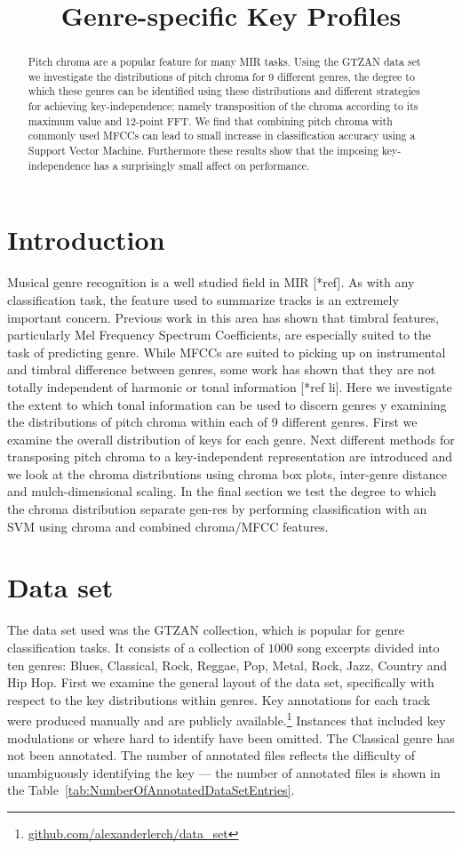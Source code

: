 \documentclass{article}
\title{Genre-specific Key Profiles}
\begin{document}
%
\maketitle
%
\begin{abstract}
Pitch chroma are a popular feature for many MIR tasks. Using the GTZAN data set we investigate the distributions of pitch chroma for 9 different genres, the degree to
which these genres can be identified using these distributions and different strategies for achieving key-independence; namely transposition of the chroma according to its maximum value and 12-point FFT. We find that combining pitch chroma with commonly used MFCCs can lead to small increase in classification accuracy using a Support Vector Machine. Furthermore these results show that the imposing key-independence has a surprisingly small affect on performance.
\end{abstract}
%
\section{Introduction}\label{sec:introduction}
Musical genre recognition is a well studied field in MIR [*ref]. As with any classification task, the feature used to summarize tracks is an extremely important concern. Previous work in this area has shown that timbral features, particularly Mel Frequency Spectrum Coefficients, are especially suited to the task of predicting genre. While MFCCs are suited to picking up on instrumental and timbral difference between genres, some work has shown that they are not totally independent of harmonic or tonal information [*ref li]. Here we investigate the extent to which tonal information can be used to discern genres y examining the distributions of pitch chroma within each of 9 different genres. First we examine the overall distribution of keys for each genre. Next different methods for transposing pitch chroma to a key-independent representation are introduced and we look at the chroma distributions using chroma box plots, inter-genre distance and mulch-dimensional scaling. In the final section we test the degree to which the chroma distribution separate gen-res by performing classification with an SVM using chroma and combined chroma/MFCC features.

\section{Data set}\label{sec:dataset}
The data set used was the GTZAN collection, which is popular for genre classification tasks. It consists of a collection of $1000$ song excerpts divided into ten genres: Blues, Classical, Rock, Reggae, Pop, Metal, Rock, Jazz, Country and Hip Hop. First we examine the general layout of the data set, specifically with respect to the key distributions within genres. Key annotations for each track were produced manually and are publicly available.\footnote{\url{github.com/alexanderlerch/data_set}} Instances that included key modulations or where hard to identify have been omitted. The Classical genre has not been annotated. The number of annotated files reflects the difficulty of unambiguously identifying the key --- the number of annotated files is shown in the Table~\ref{tab:NumberOfAnnotatedDataSetEntries}. 
\end{document}
